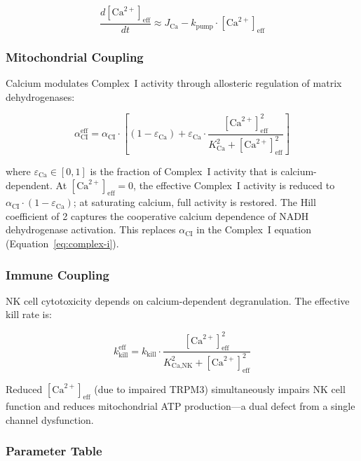 \begin{equation}
\label{eq:calcium-qss}
\frac{d[\text{Ca}^{2+}]_{\text{eff}}}{dt} \approx J_{\text{Ca}} - k_{\text{pump}} \cdot [\text{Ca}^{2+}]_{\text{eff}}
\end{equation}

\subsubsection{Mitochondrial Coupling}

Calcium modulates Complex~I activity through allosteric regulation of matrix dehydrogenases:

\begin{equation}
\label{eq:calcium-mito}
\alpha_{\text{CI}}^{\text{eff}} = \alpha_{\text{CI}} \cdot \left[(1 - \varepsilon_{\text{Ca}}) + \varepsilon_{\text{Ca}} \cdot \frac{[\text{Ca}^{2+}]_{\text{eff}}^2}{K_{\text{Ca}}^2 + [\text{Ca}^{2+}]_{\text{eff}}^2}\right]
\end{equation}

where $\varepsilon_{\text{Ca}} \in [0, 1]$ is the fraction of Complex~I activity that is calcium-dependent. At $[\text{Ca}^{2+}]_{\text{eff}} = 0$, the effective Complex~I activity is reduced to $\alpha_{\text{CI}} \cdot (1 - \varepsilon_{\text{Ca}})$; at saturating calcium, full activity is restored. The Hill coefficient of 2 captures the cooperative calcium dependence of NADH dehydrogenase activation. This replaces $\alpha_{\text{CI}}$ in the Complex~I equation (Equation~\ref{eq:complex-i}).

\subsubsection{Immune Coupling}

NK cell cytotoxicity depends on calcium-dependent degranulation. The effective kill rate is:

\begin{equation}
\label{eq:calcium-nk}
k_{\text{kill}}^{\text{eff}} = k_{\text{kill}} \cdot \frac{[\text{Ca}^{2+}]_{\text{eff}}^2}{K_{\text{Ca,NK}}^2 + [\text{Ca}^{2+}]_{\text{eff}}^2}
\end{equation}

Reduced $[\text{Ca}^{2+}]_{\text{eff}}$ (due to impaired TRPM3) simultaneously impairs NK cell function and reduces mitochondrial ATP production---a dual defect from a single channel dysfunction.

\subsubsection{Parameter Table}

